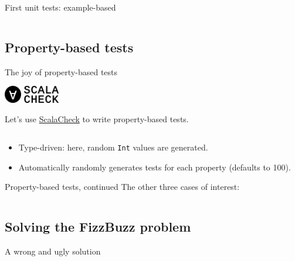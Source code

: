 \begin{frame}[fragile]{First unit tests: example-based}
  \inputminted{scala}{FizzBuzzSpec1.scala}
\end{frame}

\subsection{Property-based tests}

\begin{frame}[fragile]{The joy of property-based tests}
  \begin{center}
    \includegraphics[height=0.75cm]{logo_forall_h61.png}
    \includegraphics[height=0.75cm]{logo_scalacheck_h61.png}
  \end{center}

  Let's use \href{http://scalacheck.org/}{ScalaCheck} to write \alert{property-based} tests.

  \inputminted{scala}{FizzBuzzSpec2.scala}

  \begin{itemize}
  \item \alert{Type-driven}: here, random \texttt{Int} values are generated.
  \item Automatically randomly generates tests for each property (defaults to 100).
  \end{itemize}
\end{frame}

\begin{frame}[fragile]{Property-based tests, continued}
  The other three cases of interest:

  \inputminted{scala}{FizzBuzzSpec3.scala}
\end{frame}

\subsection{Solving the FizzBuzz problem}

\begin{frame}[fragile]{A wrong and ugly solution}
  \inputminted[gobble=2]{scala}{FizzBuzzIf.scala}

  \inputminted{console}{testQuick3.console}
\end{frame}

